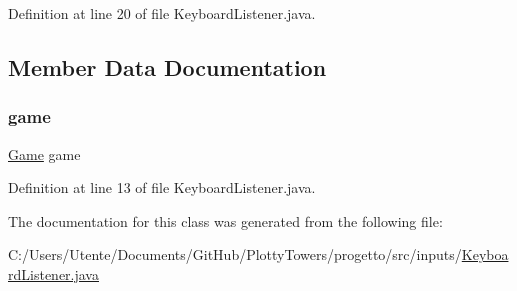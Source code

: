Definition at line 20 of file Keyboard\+Listener.\+java.



\subsection{Member Data Documentation}
\mbox{\label{classinputs_1_1_keyboard_listener_ac6a5ed6191fcf3a5bf0445921feb4f48}} 
\subsubsection{\texorpdfstring{game}{game}}
{\footnotesize\ttfamily \hyperlink{classprogetto_1_1_game}{Game} game\hspace{0.3cm}{\ttfamily [private]}}



Definition at line 13 of file Keyboard\+Listener.\+java.



The documentation for this class was generated from the following file\+:\begin{DoxyCompactItemize}
\item 
C\+:/\+Users/\+Utente/\+Documents/\+Git\+Hub/\+Plotty\+Towers/progetto/src/inputs/\hyperlink{_keyboard_listener_8java}{Keyboard\+Listener.\+java}\end{DoxyCompactItemize}
